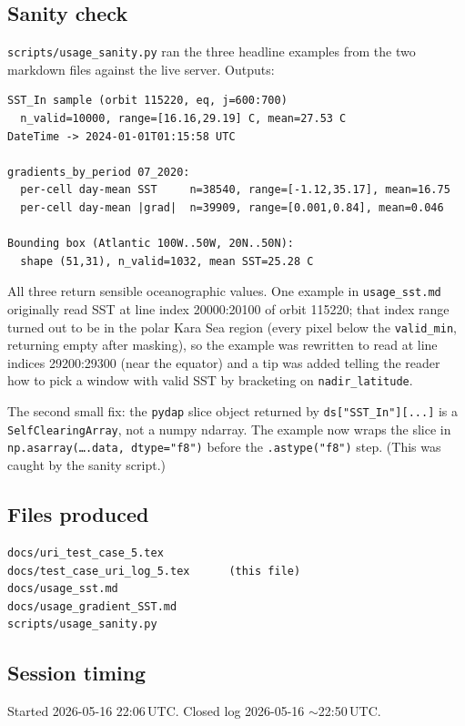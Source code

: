 \documentclass[11pt]{article}
\begin{document}
\subsection{Sanity check}

\texttt{scripts/usage\_sanity.py} ran the three headline examples
from the two markdown files against the live server. Outputs:

\begin{lstlisting}
SST_In sample (orbit 115220, eq, j=600:700)
  n_valid=10000, range=[16.16,29.19] C, mean=27.53 C
DateTime -> 2024-01-01T01:15:58 UTC

gradients_by_period 07_2020:
  per-cell day-mean SST     n=38540, range=[-1.12,35.17], mean=16.75
  per-cell day-mean |grad|  n=39909, range=[0.001,0.84], mean=0.046

Bounding box (Atlantic 100W..50W, 20N..50N):
  shape (51,31), n_valid=1032, mean SST=25.28 C
\end{lstlisting}

All three return sensible oceanographic values. One example in
\texttt{usage\_sst.md} originally read SST at line index
20000:20100 of orbit 115220; that index range turned out to be in
the polar Kara Sea region (every pixel below the
\texttt{valid\_min}, returning empty after masking), so the
example was rewritten to read at line indices 29200:29300 (near
the equator) and a tip was added telling the reader how to pick a
window with valid SST by bracketing on \texttt{nadir\_latitude}.

The second small fix: the \texttt{pydap} slice object returned by
\texttt{ds["SST\_In"][...]} is a \texttt{SelfClearingArray}, not a
numpy ndarray. The example now wraps the slice in
\texttt{np.asarray(\ldots .data, dtype="f8")} before the
\texttt{.astype("f8")} step. (This was caught by the sanity
script.)

\subsection{Files produced}

\begin{lstlisting}
docs/uri_test_case_5.tex
docs/test_case_uri_log_5.tex      (this file)
docs/usage_sst.md
docs/usage_gradient_SST.md
scripts/usage_sanity.py
\end{lstlisting}

\subsection{Session timing}

Started 2026-05-16 22:06\,UTC. Closed log 2026-05-16
$\sim$22:50\,UTC.
\end{document}
